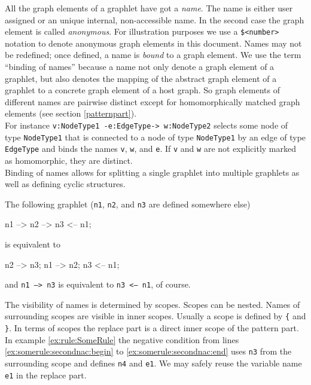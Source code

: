 All the graph elements of a graphlet have got a \emph{name}.
The name is either user assigned or an unique internal, non-accessible name.
In the second case the graph element is called \emph{anonymous}.
For illustration purposes we use a \texttt{\$<number>} notation to denote anonymous graph elements in this document.
Names may not be redefined; once defined, a name is \emph{bound} to a graph element. 
We use the term ``binding of names'' because a name not only denote a graph element of a graphlet, but also denotes the mapping of the abstract graph element of a graphlet to a concrete graph element of a host graph.
So graph elements of different names are pairwise distinct except for homomorphically matched graph elements (see section \ref{patternpart}).\\
For instance \texttt{v:NodeType1 -e:EdgeType-> w:NodeType2} selects some node of type \texttt{Node\-Type1} that is connected to a node of type \texttt{NodeType1} by an edge of type \texttt{EdgeType} and binds the names \texttt{v}, \texttt{w}, and \texttt{e}. 
If \texttt{v} and \texttt{w} are not explicitly marked as homomorphic, they are distinct.\\
Binding of names allows for splitting a single graphlet into multiple graphlets as well as defining cyclic structures.
\begin{example}
The following graphlet (\texttt{n1}, \texttt{n2}, and \texttt{n3} are defined somewhere else)
\begin{grgen}
n1 --> n2 --> n3 <-- n1;
\end{grgen}
is equivalent to
\begin{grgen}
n2 --> n3;
n1 --> n2;
n3 <-- n1;
\end{grgen}
and \texttt{n1 --> n3} is equivalent to \texttt{n3 <-- n1}, of course.
\end{example}
The visibility of names is determined by scopes. 
Scopes can be nested. 
Names of surrounding scopes are visible in inner scopes. 
Usually a scope is defined by \texttt{\{} and \texttt{\}}.
In terms of scopes the replace part is a direct inner scope of the pattern part.
In example \ref{ex:rule:SomeRule} the negative condition from lines \ref{ex:somerule:secondnac:begin} to \ref{ex:somerule:secondnac:end} uses \texttt{n3} from the surrounding scope and defines \texttt{n4} and \texttt{e1}. 
We may safely reuse the variable name \texttt{e1} in the replace part.

